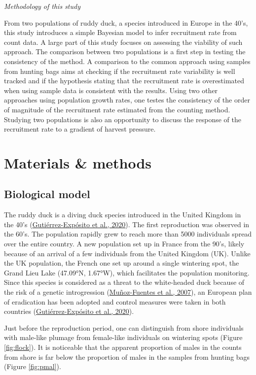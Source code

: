 \documentclass[
  english,
]{article}
\begin{document}
\emph{Methodology of this study}

From two populations of ruddy duck, a species introduced in Europe in the 40's, this study introduces a simple Bayesian model to infer recruitment rate from count data. A large part of this study focuses on assessing the viability of such approach. The comparison between two populations is a first step in testing the consistency of the method. A comparison to the common approach using samples from hunting bags aims at checking if the recruitment rate variability is well tracked and if the hypothesis stating that the recruitment rate is overestimated when using sample data is consistent with the results. Using two other approaches using population growth rates, one testes the consistency of the order of magnitude of the recruitment rate estimated from the counting method. Studying two populations is also an opportunity to discuss the response of the recruitment rate to a gradient of harvest pressure.

\hypertarget{MM}{%
\section{Materials \& methods}\label{MM}}

\hypertarget{biological-model}{%
\subsection{Biological model}\label{biological-model}}

The ruddy duck is a diving duck species introduced in the United Kingdom in the 40's (\protect\hyperlink{ref-GutierrezExposito2020}{Gutiérrez-Expósito et al., 2020}). The first reproduction was observed in the 60's. The population rapidly grew to reach more than 5000 individuals spread over the entire country. A new population set up in France from the 90's, likely because of an arrival of a few individuals from the United Kingdom (UK). Unlike the UK population, the French one set up around a single wintering spot, the Grand Lieu Lake (47.09°N, 1.67°W), which facilitates the population monitoring. Since this species is considered as a threat to the white-headed duck because of the risk of a genetic introgression (\protect\hyperlink{ref-MunozFuentes2007}{Muñoz-Fuentes et al., 2007}), an European plan of eradication has been adopted and control measures were taken in both countries (\protect\hyperlink{ref-GutierrezExposito2020}{Gutiérrez-Expósito et al., 2020}).

Just before the reproduction period, one can distinguish from shore individuals with male-like plumage from female-like individuals on wintering spots (Figure \ref{fig:flock}). It is noticeable that the apparent proportion of males in the counts from shore is far below the proportion of males in the samples from hunting bags (Figure \ref{fig:pmal}).
\end{document}
